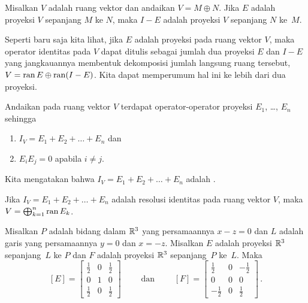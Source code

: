 \begin{prop} Misalkan $V$ adalah ruang vektor dan andaikan $V = M \oplus N$. Jika $E$ adalah
proyeksi $V$ sepanjang $M$ ke $N$, maka $I - E$ adalah proyeksi $V$ sepanjang $N$
ke~$M$.
\end{prop}

Seperti baru saja kita lihat, jika $E$ adalah proyeksi pada ruang vektor $V$, maka operator
identitas pada $V$ dapat ditulis sebagai jumlah dua proyeksi $E$ dan $I - E$ yang
jangkauannya membentuk dekomposisi jumlah langsung ruang tersebut, $V = \operatorname{ran} E \oplus \operatorname{ran}
(I - E)$. Kita dapat memperumum hal ini ke lebih dari dua proyeksi.

\begin{defn} Andaikan pada ruang vektor $V$ terdapat operator-operator proyeksi $E_1$,
\dots, $E_n$ sehingga
\begin{enumerate}
    \item $I_V = E_1 + E_2 + \dots + E_n$ dan
    \item $E_iE_j = 0$ apabila $i \ne j$.
\end{enumerate}
Kita mengatakan bahwa $I_V = E_1 + E_2 + \dots + E_n$ adalah
.
\end{defn}

\begin{prop} Jika $I_V = E_1 + E_2 + \dots + E_n$ adalah resolusi identitas pada ruang
vektor $V$, maka $V = \bigoplus_{k=1}^n \operatorname{ran} E_k$.
\end{prop}

\begin{exam} Misalkan $P$ adalah bidang dalam $\mathbb{R}^3$ yang persamaannya $x - z = 0$ dan $L$ adalah garis
yang persamaannya $y = 0$ dan $x = -z$. Misalkan $E$ adalah proyeksi $\mathbb{R}^3$ sepanjang~$L$
ke $P$ dan $F$ adalah proyeksi $\mathbb{R}^3$ sepanjang~$P$ ke~$L$. Maka
 \[[E] = \begin{bmatrix}
              \frac12  & 0 & \frac12 \\
                  0    & 1 &   0     \\
              \frac12  & 0 & \frac12
         \end{bmatrix} \qquad \text{ dan } \qquad
   [F] = \begin{bmatrix}
              \frac12  & 0 & -\frac12 \\
                  0    & 0 &   0     \\
             -\frac12  & 0 &  \frac12
         \end{bmatrix}\,. \]
\end{exam}

